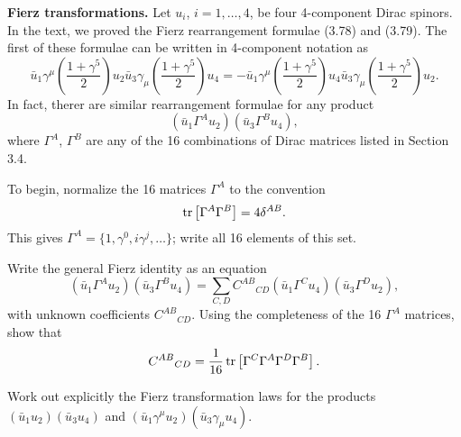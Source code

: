 \problem \textbf{Fierz transformations.} Let $u_i$, $i = 1, \dots, 4$, be four 4-component Dirac spinors.
In the text, we proved the Fierz rearrangement formulae (3.78) and (3.79). The first of these formulae can
be written in 4-component notation as
\begin{equation*}
    \bar{u}_1\gamma^\mu\left(\frac{1 + \gamma^5}{2}\right)u_2
    \bar{u}_3\gamma_\mu\left(\frac{1 + \gamma^5}{2}\right)u_4 = -
    \bar{u}_1\gamma^\mu\left(\frac{1 + \gamma^5}{2}\right)u_4
    \bar{u}_3\gamma_\mu\left(\frac{1 + \gamma^5}{2}\right)u_2.
\end{equation*}
In fact, therer are similar rearrangement formulae for any product
\[
    (\bar{u}_1\Gamma^Au_2)(\bar{u}_3\Gamma^Bu_4),
\]
where $\Gamma^A$, $\Gamma^B$ are any of the 16 combinations of Dirac matrices listed in Section 3.4.
\begin{problembody}
    \item To begin, normalize the 16 matrices $\Gamma^A$ to the convention
    \begin{equation}\label{equ:cp3:gamma_convention}
        \operatorname{tr}\left[\Gamma^A\Gamma^B\right] = 4\delta^{AB}.
    \end{equation}
    This gives $\Gamma^A = \{1, \gamma^0, i\gamma^j, \dots\}$; write all 16 elements of this set.

    \item Write the general Fierz identity as an equation
    \begin{equation}\label{equ:cp3:fierz_trans_g}
        (\bar{u}_1\Gamma^Au_2)(\bar{u}_3\Gamma^Bu_4) =
        \sum_{C, D} C^{AB}{}_{CD} (\bar{u}_1\Gamma^Cu_4)(\bar{u}_3\Gamma^Du_2),
    \end{equation}
    with unknown coefficients $C^{AB}{}_{CD}$. Using the completeness of the 16 $\Gamma^A$ matrices, show that
    \begin{equation*}
        C^{AB}{}_{CD} = \frac{1}{16}\operatorname{tr}\left[\Gamma^C\Gamma^A\Gamma^D\Gamma^B\right].
    \end{equation*}

    \item Work out explicitly the Fierz transformation laws for the products $(\bar{u}_1u_2)(\bar{u}_3u_4)$ and 
    $(\bar{u}_1\gamma^\mu u_2)(\bar{u}_3\gamma_\mu u_4)$.
\end{problembody}

